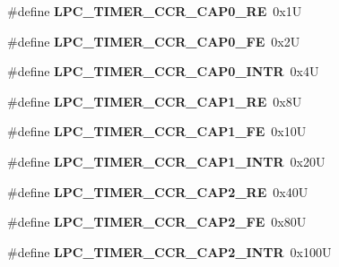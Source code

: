 \begin{DoxyCompactItemize}
\item 
\mbox{\label{group__lpc__timer_ga4c5cf50ad990e7fbd3f5cf5a1c574592}} 
\#define {\bfseries L\+P\+C\+\_\+\+T\+I\+M\+E\+R\+\_\+\+C\+C\+R\+\_\+\+C\+A\+P0\+\_\+\+RE}~0x1U
\item 
\mbox{\label{group__lpc__timer_gaf0dcbb9d5fe0169894638ad2c3570555}} 
\#define {\bfseries L\+P\+C\+\_\+\+T\+I\+M\+E\+R\+\_\+\+C\+C\+R\+\_\+\+C\+A\+P0\+\_\+\+FE}~0x2U
\item 
\mbox{\label{group__lpc__timer_ga8f4c60e4a728c0d5f2fbbe7f018b5f71}} 
\#define {\bfseries L\+P\+C\+\_\+\+T\+I\+M\+E\+R\+\_\+\+C\+C\+R\+\_\+\+C\+A\+P0\+\_\+\+I\+N\+TR}~0x4U
\item 
\mbox{\label{group__lpc__timer_gad44a843881a3f88833fef68c1e550547}} 
\#define {\bfseries L\+P\+C\+\_\+\+T\+I\+M\+E\+R\+\_\+\+C\+C\+R\+\_\+\+C\+A\+P1\+\_\+\+RE}~0x8U
\item 
\mbox{\label{group__lpc__timer_gae275bd15d65cc019f361871f613db9ab}} 
\#define {\bfseries L\+P\+C\+\_\+\+T\+I\+M\+E\+R\+\_\+\+C\+C\+R\+\_\+\+C\+A\+P1\+\_\+\+FE}~0x10U
\item 
\mbox{\label{group__lpc__timer_ga88189c057734a61665c2b64cc1438814}} 
\#define {\bfseries L\+P\+C\+\_\+\+T\+I\+M\+E\+R\+\_\+\+C\+C\+R\+\_\+\+C\+A\+P1\+\_\+\+I\+N\+TR}~0x20U
\item 
\mbox{\label{group__lpc__timer_ga2d32c6ed48189359b5878c105a8323ee}} 
\#define {\bfseries L\+P\+C\+\_\+\+T\+I\+M\+E\+R\+\_\+\+C\+C\+R\+\_\+\+C\+A\+P2\+\_\+\+RE}~0x40U
\item 
\mbox{\label{group__lpc__timer_ga808a18aeab7bbbcc5e5f845e8dbd95ef}} 
\#define {\bfseries L\+P\+C\+\_\+\+T\+I\+M\+E\+R\+\_\+\+C\+C\+R\+\_\+\+C\+A\+P2\+\_\+\+FE}~0x80U
\item 
\mbox{\label{group__lpc__timer_gaf31d53fa1871fa2fa21a20cc3a73e5b6}} 
\#define {\bfseries L\+P\+C\+\_\+\+T\+I\+M\+E\+R\+\_\+\+C\+C\+R\+\_\+\+C\+A\+P2\+\_\+\+I\+N\+TR}~0x100U
\item 

\end{DoxyCompactItemize}
